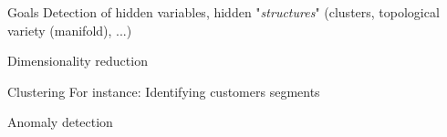 \begin{frame}{Goals}
  Detection of hidden variables, hidden "\textit{structures}" (clusters, topological variety (manifold), ...)

  \begin{minipage}[l]{0.69\linewidth}
  \end{minipage}\hfill
  \begin{minipage}[l]{0.29\linewidth}
  \end{minipage}\hfill
\end{frame}

\begin{frame}{Dimensionality reduction}
\end{frame}

\begin{frame}{Clustering}
  For instance: Identifying customers segments
\end{frame}

\begin{frame}{Anomaly detection}
\end{frame}
